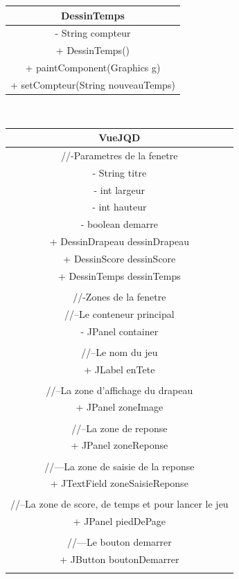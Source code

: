 \documentclass{article}
\begin{document}
\begin{center}
\bigskip
\begin{tabular}{|c|}
	\hline
	DessinTemps\\
	\hline
	- String compteur\\
	\hline
	+ DessinTemps()\\
	+ paintComponent(Graphics g)\\
	+ setCompteur(String nouveauTemps)\\
	\hline
\end{tabular}\\
\begin{longtable}{|c|}
	\hline
	VueJQD\\
	\hline
	  //-Parametres de la fenetre\\
	  - String titre\\
	  - int largeur\\
	  - int hauteur\\
	  - boolean demarre\\
	  + DessinDrapeau dessinDrapeau\\
	  + DessinScore dessinScore\\
	  + DessinTemps dessinTemps\\
	  \\
	  //-Zones de la fenetre\\
	  //--Le conteneur principal\\
	  - JPanel container\\
	  \\
	  //--Le nom du jeu\\
	  + JLabel enTete\\
	  \\
	  //--La zone d'affichage du drapeau\\
	  + JPanel zoneImage\\
	  \\
	  //--La zone de reponse\\
	  + JPanel zoneReponse\\
	  \\
	  //---La zone de saisie de la reponse\\
	  + JTextField zoneSaisieReponse\\
	  \\
	  //--La zone de score, de temps et pour lancer le jeu\\
	  + JPanel piedDePage\\
	  \\
	  //---Le bouton demarrer\\
	  + JButton boutonDemarrer\\
	  \\

\end{longtable}
\end{center}
\end{document}
